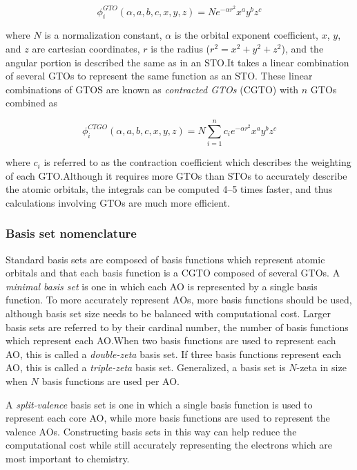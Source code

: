 \begin{equation}
\phi_i^{GTO}(\alpha,a,b,c,x,y,z) = N e^{-\alpha r^2} x^a y^b z^c
\end{equation}

\noindent where $N$ is a normalization constant, $\alpha$ is the orbital exponent coefficient, $x$, $y$, and $z$ are cartesian coordinates, $r$ is the radius ($r^2=x^2+y^2+z^2$), and the angular portion is described the same as in an STO.\@ It takes a linear combination of several GTOs to represent the same function as an STO. These linear combinations of GTOS are known as \emph{contracted GTOs} (CGTO) with $n$ GTOs combined as

\begin{equation}
\phi_i^{CTGO}(\alpha,a,b,c,x,y,z) = N \sum_{i=1}^n c_i e^{-\alpha r^2} x^a y^b z^c
\end{equation}

\noindent where $c_i$ is referred to as the contraction coefficient which describes the weighting of each GTO.\@ Although it requires more GTOs than STOs to accurately describe the atomic orbitals, the integrals can be computed 4--5 times faster, and thus calculations involving GTOs are much more efficient.\cite{Gill1994}

\subsubsection{Basis set nomenclature}

Standard basis sets are composed of basis functions which represent atomic orbitals and that each basis function is a CGTO composed of several GTOs. A \emph{minimal basis set} is one in which each AO is represented by a single basis function. To more accurately represent AOs, more basis functions should be used, although basis set size needs to be balanced with computational cost. Larger basis sets are referred to by their cardinal number, the number of basis functions which represent each AO.\@ When two basis functions are used to represent each AO, this is called a \emph{double-zeta} basis set. If three basis functions represent each AO, this is called a \emph{triple-zeta} basis set. Generalized, a basis set is $N$-zeta in size when $N$ basis functions are used per AO.\@

A \emph{split-valence} basis set is one in which a single basis function is used to represent each core AO, while more basis functions are used to represent the valence AOs. Constructing basis sets in this way can help reduce the computational cost while still accurately representing the electrons which are most important to chemistry.

